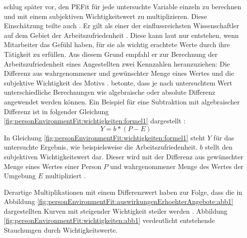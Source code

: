 \textcite[S. 38]{harrison:1985} schlug später vor, den \ac{PEFit} für jede untersuchte Variable einzeln zu berechnen und mit einem subjektiven Wichtigkeitswert zu multiplizieren. Diese Einschätzung teilte auch \textcite[S. 18]{locke:1969}\cite[S. 8f.]{locke:1976}. Er gilt als einer der einflussreichsten Wissenschaftler auf dem Gebiet der Arbeitszufriedenheit \cite[S. 12]{edwards:2008}. Diese kann laut \textcite[S. 8]{locke:1969} nur entstehen, wenn Mitarbeiter das Gefühl haben, für sie als wichtig erachtete Werte durch ihre Tätigkeit zu erfüllen. Aus diesem Grund empfahl er zur Berechnung der Arbeitszufriedenheit eines Angestellten zwei Kennzahlen heranzuziehen: Die Differenz aus wahrgenommener und gewünschter Menge eines Wertes und die subjektive Wichtigkeit des Motivs \cite[S. 8]{locke:1976}. \textcite[S. 16]{locke:1969} betonte, dass je nach untersuchtem Wert unterschiedliche Berechnungen wie algebraische oder absolute Differenz angewendet werden können. Ein Beispiel für eine Subtraktion mit algebraischer Differenz ist in folgender Gleichung \ref{fig:personEnvironmentFit:wichtigkeiten:formel1} dargestellt \cite[S. 9]{edwards:1990}:
\begin{equation}
	Y = b * (P - E)
	\label{fig:personEnvironmentFit:wichtigkeiten:formel1}
\end{equation}
In Gleichung \ref{fig:personEnvironmentFit:wichtigkeiten:formel1} steht $Y$ für das untersuchte Ergebnis, wie beispielsweise die Arbeitszufriedenheit. $b$ stellt den subjektiven Wichtigkeitswert dar. Dieser wird mit der Differenz aus gewünschter Menge eines Wertes einer Person $P$ und wahrgenommener Menge des Wertes der Umgebung $E$ multipliziert \cite[S. 9f.]{edwards:1990}.

Derartige Multiplikationen mit einem Differenzwert haben zur Folge, dass die in Abbildung \ref{fig:personEnvironmentFit:auswirkungenErhoehterAngebote:abb1} dargestellten Kurven mit steigender Wichtigkeit steiler werden \cite[S. 9]{locke:1976}. Abbildung \ref{fig:personEnvironmentFit:wichtigkeiten:abb1} verdeutlicht entstehende Stauchungen durch Wichtigkeitswerte.

